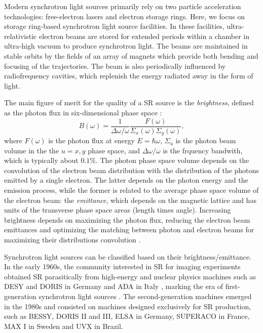 Modern synchrotron light sources primarily rely on two particle acceleration technologies: free-electron lasers and electron storage rings. Here, we focus on storage ring-based synchrotron light source facilities. In these facilities, ultra-relativistic electron beams are stored for extended periods within a chamber in ultra-high vacuum to produce synchrotron light. The beams are maintained in stable orbits by the fields of an array of magnets which provide both bending and focusing of the trajectories. The beam is also periodically influenced by radiofrequency cavities, which replenish the energy radiated away in the form of light.

The main figure of merit for the quality of a SR source is the \textit{brightness}\cite{huang_brightness_2013}, defined as the photon flux in six-dimensional phase space \cite{hettel_challenges_2014}:
\begin{equation}
    B(\omega) = \frac{1}{\Delta \omega/\omega}\frac{F(\omega)}{\Sigma_{x}(\omega)\Sigma_{y}(\omega)},
\end{equation}
where $F(\omega)$ is the photon flux at energy $E=\hbar\omega$, $\Sigma_{u}$ is the photon beam volume in the the $u=x,y$ phase space, and $\Delta\omega/\omega$ is the frquency bandwith, which is typically about $0.1\%$. The photon phase space volume depends on the convolution of the electron beam distribution with the distribution of the photons emitted by a single electron. The latter depends on the photon energy and the emission process, while the former is related to the average phase space volume of the electron beam: the \textit{emittance}, which depends on the magnetic lattice and has units of the transverse phase space areas (length times angle). Increasing brightness depends on maximizing the photon flux, reducing the electron beam emittances and optimizing the matching between photon and electron beams for maximizing their distributions convolution \cite{wiedemann_particle_2015}.

Synchrotron light sources can be classified based on their brightness/emittance. In the early 1960s, the community interested in SR for imaging experiments obtained SR parasitically from high-energy and nuclear physics machines such as DESY and DORIS in Germany and ADA in Italy \cite{simoulin_synchrotron_2016}, marking the era of first-generation synchrotron light sources \cite{liu_towards_2017}. The second-generation machines emerged in the 1980s and consisted on machines designed exclusively for SR production, such as BESSY, DORIS II and III, ELSA in Germany, SUPERACO in France, MAX I in Sweden \cite{simoulin_synchrotron_2016} and UVX in Brazil.

